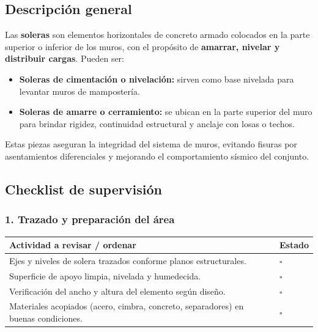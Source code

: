 \documentclass[12pt]{article}
\newcommand{\cbox}{\(\square\)} %
\begin{document}
	\subsection*{Descripción general}
	Las \textbf{soleras} son elementos horizontales de concreto armado colocados en la parte superior o inferior de los muros, con el propósito de \textbf{amarrar, nivelar y distribuir cargas}.  
	Pueden ser:
	\begin{itemize}[leftmargin=*, itemsep=0pt]
		\item \textbf{Soleras de cimentación o nivelación:} sirven como base nivelada para levantar muros de mampostería.  
		\item \textbf{Soleras de amarre o cerramiento:} se ubican en la parte superior del muro para brindar rigidez, continuidad estructural y anclaje con losas o techos.
	\end{itemize}
	Estas piezas aseguran la integridad del sistema de muros, evitando fisuras por asentamientos diferenciales y mejorando el comportamiento sísmico del conjunto.
	

	
	\subsection{Checklist de supervisión}
	
	\subsubsection*{1. Trazado y preparación del área}
	\begin{tabularx}{\linewidth}{>{\raggedright\arraybackslash}p{0.93\linewidth} >{\centering\arraybackslash}m{0.07\linewidth}}
		\toprule
		\textbf{Actividad a revisar / ordenar} & \textbf{Estado}\\
		\midrule
		Ejes y niveles de solera trazados conforme planos estructurales. & \cbox \\
		Superficie de apoyo limpia, nivelada y humedecida. & \cbox \\
		Verificación del ancho y altura del elemento según diseño. & \cbox \\
		Materiales acopiados (acero, cimbra, concreto, separadores) en buenas condiciones. & \cbox \\
		\bottomrule
	\end{tabularx}
	
\end{document}
